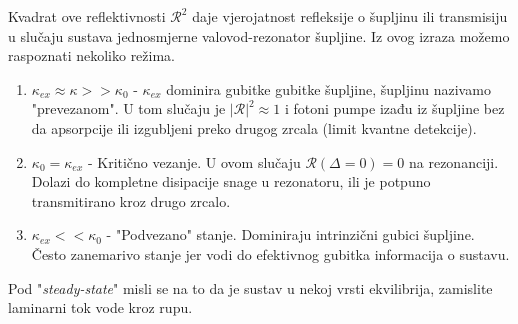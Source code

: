 Kvadrat ove reflektivnosti $\mathcal{R}^2$ daje vjerojatnost refleksije o šupljinu ili transmisiju u slučaju sustava jednosmjerne valovod-rezonator šupljine.
Iz ovog izraza možemo raspoznati nekoliko režima. 
\begin{enumerate}
	\item $\kappa_{ex} \approx \kappa >>\kappa_0$ - $\kappa_{ex}$ dominira gubitke gubitke šupljine, šupljinu nazivamo "prevezanom". U tom slučaju je $|\mathcal{R}|^2 \approx 1$ 
i fotoni pumpe izađu iz šupljine bez da apsorpcije ili izgubljeni preko drugog zrcala (limit kvantne detekcije).
	\item  $\kappa_0 = \kappa_{ex}$ - Kritično vezanje. U ovom slučaju $\mathcal{R} (\Delta = 0) = 0$ na rezonanciji. Dolazi do kompletne disipacije snage u rezonatoru, ili je potpuno transmitirano kroz drugo zrcalo.
	\item $\kappa_{ex} << \kappa_0$ - "Podvezano" stanje. Dominiraju intrinzični gubici šupljine. Često zanemarivo stanje jer vodi do efektivnog gubitka informacija o sustavu.
\end{enumerate}

\begin{Bilješka}
	Pod "\textit{steady-state}" misli se na to da je sustav u nekoj vrsti ekvilibrija, zamislite laminarni tok vode kroz rupu.
\end{Bilješka}
